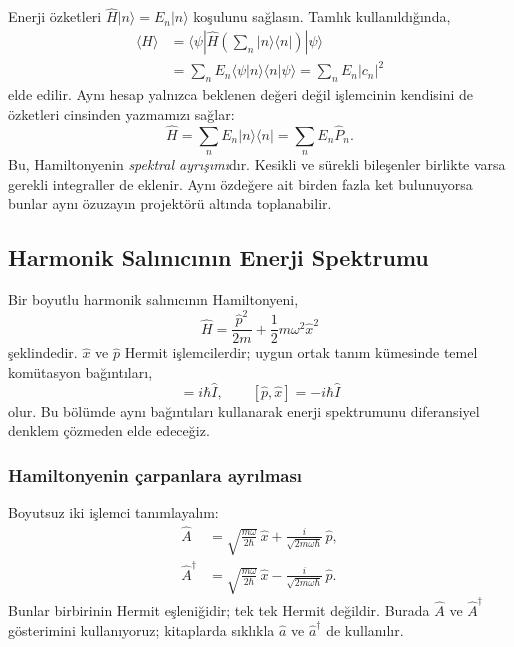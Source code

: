 \documentclass[00_kitap.tex]{subfiles}
\begin{document}
Enerji özketleri $\hat H|n\rangle=E_n|n\rangle$ koşulunu sağlasın.
Tamlık kullanıldığında,
\begin{align}
 \langle H\rangle
 &=\langle\psi|\hat H\left(\sum_n|n\rangle\langle n|\right)
                  |\psi\rangle\\
 &=\sum_n E_n\langle\psi|n\rangle\langle n|\psi\rangle
 =\boxed{\sum_n E_n|c_n|^2}
 \label{eq:06_enerji_ortalama}
\end{align}
elde edilir. Aynı hesap yalnızca beklenen değeri değil işlemcinin
kendisini de özketleri cinsinden yazmamızı sağlar:
\begin{equation}
 \boxed{\hat H=\sum_n E_n|n\rangle\langle n|
              =\sum_n E_n\hat P_n.}
 \label{eq:06_spektral}
\end{equation}
Bu, Hamiltonyenin \emph{spektral ayrışımı}dır. Kesikli ve sürekli
bileşenler birlikte varsa gerekli integraller de eklenir. Aynı
özdeğere ait birden fazla ket bulunuyorsa bunlar aynı özuzayın
projektörü altında toplanabilir.

\subsection{Harmonik Salınıcının Enerji Spektrumu}
\label{sec:06_harmonik}

Bir boyutlu harmonik salınıcının Hamiltonyeni,
\begin{equation}
 \hat H=\frac{\hat p^2}{2m}+\frac12m\omega^2\hat x^2
 \label{eq:06_ho_hamiltonyen}
\end{equation}
şeklindedir. $\hat x$ ve $\hat p$ Hermit işlemcilerdir; uygun ortak
tanım kümesinde temel komütasyon bağıntıları,
\begin{equation}
 [\hat x,\hat p]=i\hbar\hat I,\qquad
 [\hat p,\hat x]=-i\hbar\hat I
\end{equation}
olur. Bu bölümde aynı bağıntıları kullanarak enerji spektrumunu
diferansiyel denklem çözmeden elde edeceğiz.

\subsubsection{Hamiltonyenin çarpanlara ayrılması}

Boyutsuz iki işlemci tanımlayalım:
\begin{align}
 \hat A&=\sqrt{\frac{m\omega}{2\hbar}}\,\hat x
       +\frac{i}{\sqrt{2m\omega\hbar}}\,\hat p,\\
 \hat A^\dagger&=\sqrt{\frac{m\omega}{2\hbar}}\,\hat x
       -\frac{i}{\sqrt{2m\omega\hbar}}\,\hat p.
 \label{eq:06_merdiven_tanim}
\end{align}
Bunlar birbirinin Hermit eşleniğidir; tek tek Hermit değildir.
Burada $\hat A$ ve $\hat A^\dagger$ gösterimini kullanıyoruz;
kitaplarda sıklıkla $\hat a$ ve $\hat a^\dagger$ de kullanılır.
\end{document}
